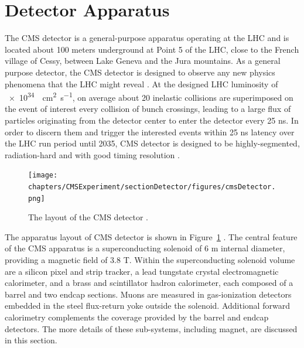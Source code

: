 

\section{Detector Apparatus}
\label{sec:cmsexperiment:detector}



The CMS \cite{exhep:cms:Chatrchyan:2008aa} detector is a general-purpose apparatus operating at the LHC and is located about 100 meters underground at Point 5 of the LHC, close to the French village of Cessy, between Lake Geneva and the Jura mountains. As a general purpose detector, the CMS detector is designed to observe any new physics phenomena that the LHC might reveal \cite{cms:tdr2:Ball:2007zza}. At the designed LHC luminosity of \SI{e34}{\per\cm\squared \per\s}, on average about 20 inelastic collisions are superimposed on the event of interest every collision of bunch crossings, leading to a large flux of particles originating from the detector center to enter the detector every 25 ns. In order to discern them and trigger the interested events within 25 ns latency over the LHC run period until 2035, CMS detector is designed to be highly-segmented, radiation-hard and with good timing resolution \cite{exhep:cms:Chatrchyan:2008aa}.

\begin{figure}[ht]
    \centering
    \texttt{[image: chapters/CMSExperiment/sectionDetector/figures/cmsDetector.png]}
    \caption{The layout of the CMS detector \cite{cms:detectorOverview}.}
    \label{sec:cmsexperiment:detector:detectorOverview}
\end{figure}

The apparatus layout of CMS detector is shown in Figure~\ref{sec:cmsexperiment:detector:detectorOverview} \cite{cms:detectorOverview}. The central feature of the CMS apparatus is a superconducting solenoid of 6 m internal diameter, providing a magnetic field of 3.8 T. Within the superconducting solenoid volume are a silicon pixel and strip tracker, a lead tungstate crystal electromagnetic calorimeter, and a brass and scintillator hadron calorimeter, each composed of a barrel and two endcap sections. Muons are measured in gas-ionization detectors embedded in the steel flux-return yoke outside the solenoid. Additional forward calorimetry complements the coverage provided by the barrel and endcap detectors. The more details of these sub-systems, including magnet,  are discussed in this section. 

